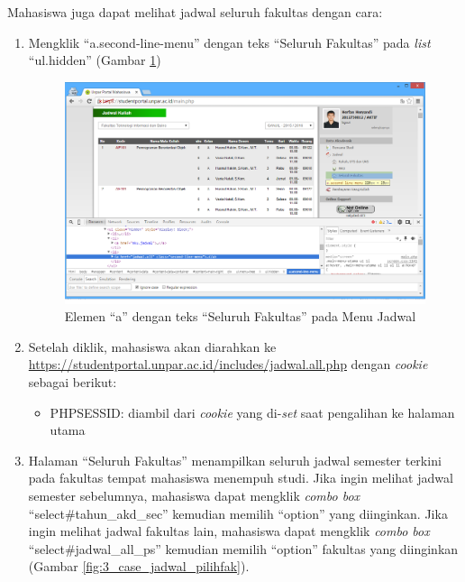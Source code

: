 \documentclass[a4paper,twoside]{article}
\begin{document}
\begin{enumerate}
\begin{enumerate}
\begin{enumerate}
\end{enumerate}

Mahasiswa juga dapat melihat jadwal seluruh fakultas dengan cara:
\begin{enumerate}
	\item Mengklik ``a.second-line-menu'' dengan teks ``Seluruh Fakultas'' pada \textit{list} ``ul.hidden'' (Gambar \ref{fig:3_case_jadwal_seluruh})
	\begin{figure}[H]
			\centering
			\includegraphics[scale=0.5]{Gambar/case-jadwal-seluruh}
			\caption{Elemen ``a'' dengan teks ``Seluruh Fakultas'' pada Menu Jadwal} 
			\label{fig:3_case_jadwal_seluruh}
		\end{figure}
	\item Setelah diklik, mahasiswa akan diarahkan ke \url{https://studentportal.unpar.ac.id/includes/jadwal.all.php} dengan \textit{cookie} sebagai berikut:
\begin{itemize}
	\item PHPSESSID: diambil dari \textit{cookie} yang di-\textit{set} saat pengalihan ke halaman utama
\end{itemize}
		\item Halaman ``Seluruh Fakultas'' menampilkan seluruh jadwal semester terkini pada fakultas tempat mahasiswa menempuh studi. Jika ingin melihat jadwal semester sebelumnya, mahasiswa dapat mengklik \textit{combo box} ``select\#tahun\_akd\_sec'' kemudian memilih ``option'' yang diinginkan. Jika ingin melihat jadwal fakultas lain, mahasiswa dapat mengklik \textit{combo box} ``select\#jadwal\_all\_ps'' kemudian memilih ``option'' fakultas yang diinginkan (Gambar \ref{fig:3_case_jadwal_pilihfak}).
		\begin{figure}[H]
			\centering

\end{figure}
\end{enumerate}
\end{enumerate}
\end{enumerate}
\end{document}
